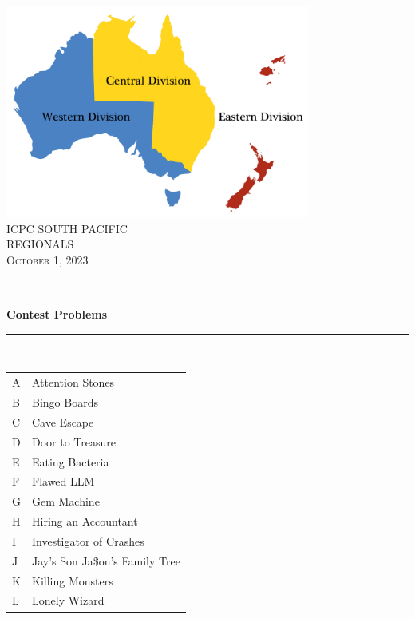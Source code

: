 \documentclass[noproblemids,a4paper]{problemset}
\newcommand{\HRule}{\rule{\linewidth}{0.5mm}}
\begin{document}
\thispagestyle{empty}
\begin{center}
\vspace*{\fill}
\includegraphics[width=10cm]{spp_divisions.png} \\

\textsc{\Huge ICPC SOUTH PACIFIC \\[0.3cm] REGIONALS}\\[0.5cm]

\textsc{\Large October 1, 2023}\\[0.3cm]

\HRule \\[0.3cm]

{ \huge \bfseries Contest Problems \\[0.3cm] }

\HRule \\[0.5cm]

{\large
\begin{tabular}{l@{:\hskip4pt}l}
A & Attention Stones \\
B & Bingo Boards \\
C & Cave Escape \\
D & Door to Treasure \\
E & Eating Bacteria \\
F & Flawed LLM \\
G & Gem Machine \\
H & Hiring an Accountant \\
I & Investigator of Crashes \\
J & Jay's Son Ja\$on's Family Tree \\
K & Killing Monsters \\
L & Lonely Wizard \\
\end{tabular}
}
\vspace*{\fill}
\end{center}
\end{document}

